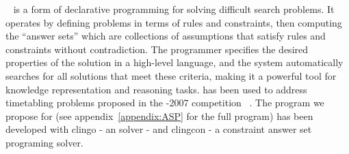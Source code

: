 
\ASP{}~\cite{2003_BARAL_BOOK} is a form of declarative programming %
for solving difficult search problems. 
It operates by defining problems in terms of rules and constraints, then computing the ``answer sets'' which are collections of assumptions that satisfy rules and constraints without contradiction.
The programmer specifies the desired properties of the solution in a high-level language, and the \ASP{} system automatically searches for all solutions that meet these criteria, making it a powerful tool for knowledge representation and reasoning tasks. 
\ASP{} has been used to address timetabling problems proposed in the \ITC{}-2007 competition
~\cite{2019_banbara_AOR}.
The \ASP{} program we propose for \UTP{}  
(see appendix~\ref{appendix:ASP} for the full program)
has been developed with clingo - an \ASP{} solver - and clingcon - a constraint answer set programing solver.

